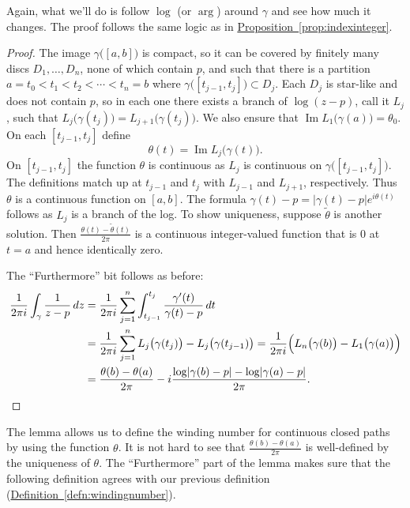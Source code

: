\documentclass[12pt,openany]{book}
\renewcommand{\Im}{\operatorname{Im}}
\newcommand{\sabs}[1]{\lvert {#1} \rvert}
\newcommand{\myquote}[1]{``#1''}
\theoremstyle{plain}
\theoremstyle{remark}
\theoremstyle{definition}
\theoremstyle{exercise}
\theoremstyle{example}
\newcommand{\propref}[1]{\hyperref[#1]{Proposition~\ref*{#1}}}
\newcommand{\defnref}[1]{\hyperref[#1]{Definition~\ref*{#1}}}
\begin{document}
Again, what we'll do is follow $\log$ (or $\arg$) around $\gamma$ and see
how much it changes.  The proof follows the same logic as in
\propref{prop:indexinteger}.

\begin{proof}
The image $\gamma\bigl([a,b]\bigr)$ is compact, so it can be covered by finitely many
discs $D_1,\ldots,D_n$, none of which contain $p$, and such that there is a
partition $a = t_0 < t_1 < t_2 < \cdots < t_n = b$ where
$\gamma\bigl([t_{j-1},t_j]\bigr) \subset D_j$.  Each $D_j$ is star-like and
does not contain $p$,
so in each one there exists a branch of $\log (z-p)$, call it $L_j$,
such that $L_j\bigl(\gamma(t_j)\bigr) = L_{j+1}\bigl(\gamma(t_j)\bigr)$.
We also ensure that $\Im L_1\bigl(\gamma(a)\bigr) = \theta_0$.
On each $[t_{j-1},t_j]$ define
\begin{equation*}
\theta(t)
=
\Im L_j\bigl(\gamma(t)\bigr) .
\end{equation*}
On $[t_{j-1},t_j]$ the function $\theta$ is continuous as $L_j$ is continuous on 
$\gamma\bigl([t_{j-1},t_j]\bigr)$.  The definitions match up at $t_{j-1}$
and $t_{j}$ with $L_{j-1}$ and $L_{j+1}$, respectively.  Thus
$\theta$ is a continuous function on $[a,b]$.
The formula $\gamma(t)-p = \sabs{\gamma(t)-p} e^{i\theta(t)}$ follows as
$L_j$ is a branch of the log.
To show uniqueness, suppose $\widetilde{\theta}$ is another solution.
Then 
$\frac{\theta(t)-\widetilde{\theta}(t)}{2\pi}$ is a continuous
integer-valued function that is $0$ at $t=a$ and hence
identically zero.

The \myquote{Furthermore} bit follows as before:
\begin{equation*}
\begin{split}
\frac{1}{2\pi i} \int_\gamma \frac{1}{z-p} \, dz
& =
\frac{1}{2\pi i} \sum_{j=1}^n \int_{t_{j-1}}^{t_j} \frac{\gamma'(t)}{\gamma(t)-p} \, dt
\\
& =
\frac{1}{2\pi i} \sum_{j=1}^n L_j\bigl(\gamma(t_j)\bigr) -
L_j\bigl(\gamma(t_{j-1})\bigr)
=
\frac{1}{2\pi i} \Bigl( L_n\bigl(\gamma(b)\bigr) - L_1\bigl(\gamma(a)\bigr) \Bigr) 
\\
& =
\frac{\theta(b)-\theta(a)}{2\pi}
- i \frac{\log \sabs{\gamma(b)-p} - \log \sabs{\gamma(a)-p}}{2\pi} .
\qedhere
\end{split}
\end{equation*}
\end{proof}

The lemma allows us to define the winding number for continuous closed paths
by using the function $\theta$.
It is not hard to see that $\frac{\theta(b)-\theta(a)}{2\pi}$
is well-defined by the uniqueness of $\theta$.
The \myquote{Furthermore} part of the
lemma makes sure that the following definition agrees with our previous
definition (\defnref{defn:windingnumber}).
\end{document}

